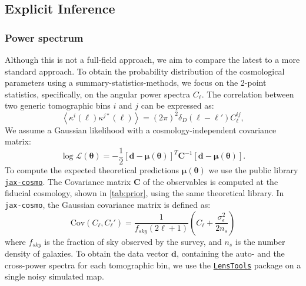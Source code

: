 \documentclass{aa}
\begin{document}
\subsection{Explicit Inference}
\subsubsection{Power spectrum}
Although this is not a full-field approach, we aim to compare the latest to a more standard approach. 
To obtain the probability distribution of the cosmological parameters using a summary-statistics-methods, we focus on the 2-point statistics, specifically, on the angular power spectra $C_{\ell}$.
The correlation between two generic tomographic bins $i$ and $j$ can be expressed as:
\begin{equation}
    \left \langle \kappa^{i}(\ell)\kappa^{j*}(\ell)\right \rangle =(2\pi)^2\delta_D(\ell-\ell')C_{\ell}^{ij},
\end{equation}
We assume a Gaussian likelihood with a cosmology-independent covariance matrix:
\begin{equation}
    \log{\mathcal{L}}(\bm{\theta})=-\frac{1}{2}[\bm{d}-\bm{\mu}(\bm{\theta})]^{T}\bm{C}^{-1}[\bm{d}-\bm{\mu}(\bm{\theta})].
\end{equation}
To compute the expected theoretical predictions $\bm{\mu}(\bm{\theta})$ we use the public library \href{https://github.com/DifferentiableUniverseInitiative/jax_cosmo}{\texttt{jax-cosmo}}. 
 The Covariance matrix $\bm{C}$ of the observables is computed at the fiducial cosmology, shown in \autoref{tab:prior}, using the same theoretical library. In {\texttt{jax-cosmo}}, the Gaussian covariance matrix is defined as:
\begin{equation}
    \text{Cov}(C_{\ell},C_{\ell}')=\frac{1}{f_{sky}(2 \ell+1)}\left(C_{\ell}+\frac{\sigma_{\epsilon}^2}{2n_s}\right)
\end{equation}
where $f_{sky}$ is the fraction of sky observed by the survey, and $n_s$ is the number density of galaxies. 
To obtain the data vector $\bm{d}$, containing the auto- and the cross-power spectra for each tomographic bin, we use the \href{https://lenstools.readthedocs.io/en/latest/lenstool} {\texttt{LensTools}} package \citep{2016A&C....17...73P} on a single noisy simulated map. 
\end{document}
